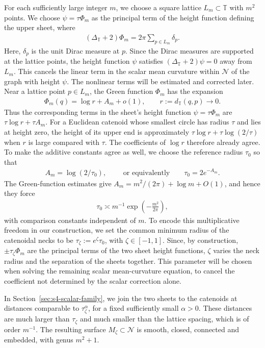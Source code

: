 \documentclass[a4paper,11pt,oneside,reqno]{amsart}
\numberwithin{equation}{section}
\theoremstyle{definition}
\begin{document}
For each sufficiently large integer $m$, we choose
a square lattice $L_m\subset\mathbb T$ with $m^2$
points. We choose $\psi=\tau\Phi_m$ as the principal term of the height function defining the upper sheet, where
%
\begin{align*}
    (\Delta_{\mathbb T}+2)\Phi_m
    =2\pi\sum_{p\in L_m}\delta_p.
\end{align*}
%
Here, $\delta_p$ is the unit Dirac measure at $p$. Since the Dirac measures are supported at the lattice
points, the height function $\psi$ satisfies
$(\Delta_{\mathbb T}+2)\psi=0$ away from $L_m$.
This cancels the linear term in the scalar mean
curvature within $\mathcal N$ of the graph with
height $\psi$. The nonlinear terms will be estimated
and corrected later.
Near a lattice point $p\in L_m$, the Green function $\Phi_m$
has the expansion
%
\begin{align*}
    \Phi_m(q)=\log r+A_m+o(1),
    \qquad r:=d_{\mathbb T}(q,p)\to0.
\end{align*}
%
Thus the corresponding terms in the sheet's height
function $\psi=\tau\Phi_m$ are
$\tau\log r+\tau A_m$.
For a Euclidean catenoid whose smallest circle has
radius $\tau$ and lies at height zero, the height
of its upper end is approximately
$\tau\log r+\tau\log(2/\tau)$ when $r$ is large
compared with $\tau$.
The coefficients of $\log r$ therefore already
agree. To make the additive constants agree as well,
we choose the reference radius $\tau_0$ so that
%
\begin{align*}
    A_m=\log(2/\tau_0),
    \qquad\text{ or equivalently}\qquad
    \tau_0=2e^{-A_m}.
\end{align*}
%
The Green-function estimates give
$A_m=m^2/(2\pi)+\log m+O(1)$, and hence they force
%
\begin{align*}
    \tau_0\asymp
    m^{-1}\exp\left(-\frac{m^2}{2\pi}\right),
\end{align*}
%
with comparison constants independent of $m$. To encode this multiplicative freedom in our construction, we set the common minimum radius of the catenoidal necks to be $\tau_\zeta:=e^\zeta\tau_0$, with $\zeta\in[-1,1]$.
Since, by construction, $\pm\tau_\zeta\Phi_m$ are the principal terms of the two sheet height functions, $\zeta$ varies the neck radius and the
separation of the sheets together. This parameter will be chosen when solving the remaining scalar mean-curvature equation, to cancel the coefficient not determined by the scalar correction alone.

In Section~\ref{sec:s4-scalar-family}, we join the two sheets
to the catenoids at distances comparable to
$\tau_\zeta^\alpha$, for a fixed sufficiently small
$\alpha>0$. These distances are much larger than
$\tau_\zeta$ and much smaller than the lattice spacing,
which is of order $m^{-1}$.
The resulting surface $M_\zeta\subset\mathcal N$
is smooth, closed, connected and embedded, with genus
$m^2+1$.
\end{document}
